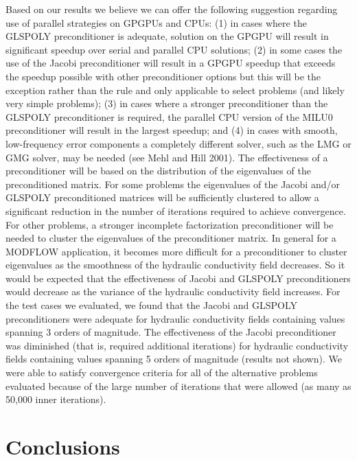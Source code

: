\documentclass[12pt]{article}
\begin{document}
\color{blue}Based on our results we believe we can offer the following suggestion regarding use of parallel strategies on GPGPUs and CPUs: (1) in cases where the GLSPOLY preconditioner is adequate, solution on the GPGPU will result in significant speedup over serial and parallel CPU solutions; (2) in some cases the use of the Jacobi preconditioner will result in a GPGPU speedup that exceeds the speedup possible with other preconditioner options but this will be the exception rather than the rule and only applicable to select problems (and likely very simple problems); (3) in cases where a stronger preconditioner than the GLSPOLY preconditioner is required, the parallel CPU version of the MILU0 preconditioner will result in the largest speedup; and (4) in cases with smooth, low-frequency error components a completely different solver, such as the LMG or GMG solver, may be needed (see Mehl and Hill 2001). The effectiveness of a preconditioner will be based on the distribution of the eigenvalues of the preconditioned matrix. For some problems the eigenvalues of the Jacobi and/or GLSPOLY preconditioned matrices will be sufficiently clustered to allow a significant reduction in the number of iterations required to achieve convergence. For other problems, a stronger incomplete factorization preconditioner will be needed to cluster the eigenvalues of the preconditioner matrix. In general for a MODFLOW application, it becomes more difficult for a preconditioner to cluster eigenvalues as the smoothness of the hydraulic conductivity field decreases. So it would be expected that the effectiveness of Jacobi and GLSPOLY preconditioners would decrease as the variance of the hydraulic conductivity field increases. For the test cases we evaluated, we found that the Jacobi and GLSPOLY preconditioners were adequate for hydraulic conductivity fields containing values spanning 3 orders of magnitude. The effectiveness of the Jacobi preconditioner was diminished (that is, required additional iterations) for hydraulic conductivity fields containing values spanning 5 orders of magnitude (results not shown). We were able to satisfy convergence criteria for all of the alternative problems evaluated because of the large number of iterations that were allowed (as many as 50,000 inner iterations).\color{black}


\section* {\bf Conclusions}
\end{document}
